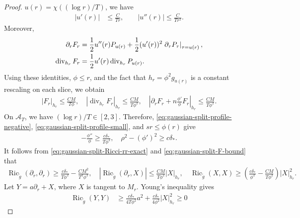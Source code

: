 \documentclass[11pt,reqno]{amsart}
\numberwithin{equation}{section}
\theoremstyle{definition}
\theoremstyle{remark}
\def\cA {\mathcal{A}}
\renewcommand{\div}{\operatorname{div}}
\newcommand{\ta}{\tau}
\newcommand{\0}{\emptyset}
\newcommand{\Ric}{\operatorname{Ric}}
\begin{document}
\begin{proof}
$u(r)=\chi((\log r)/T)$, we have
\begin{align}
        |u'(r)|
        &\leq
        \frac{C}{Tr},
        \qquad
        |u''(r)|
        \leq
        \frac{C}{Tr^2}.
\end{align}
Moreover,
\begin{align}
        \partial_rF_r
        &=
        \frac12u''(r)P_{u(r)}
        +
        \frac12(u'(r))^2
        \left.
        \partial_\ta P_\ta
        \right|_{\ta=u(r)},
        \notag\\
        \div_{h_r}F_r
        &=
        \frac12u'(r)
        \div_{h_r}P_{u(r)}.
\end{align}
Using these identities, $\phi\leq r$, and the fact that
$h_r=\phi^2g_{u(r)}$ is a constant rescaling on each slice, we obtain
\begin{align}\label{eq:gaussian-split-F-bound}
        |F_r|_{h_r}
        \leq
        \frac{CM}{T\phi},\quad 
        |\div_{h_r}F_r|_{h_r}
        \leq
        \frac{CM}{T\phi^2},\quad 
        \left|
        \partial_rF_r + n\frac{\phi'}{\phi}F_r
        \right|_{h_r}
        \leq
        \frac{CM}{T\phi^2}.
\end{align}
On $\cA_T$, we have $(\log r)/T\in[2,3]$. Therefore,
\eqref{eq:gaussian-split-profile-negative},
\eqref{eq:gaussian-split-profile-small}, and
$sr\leq\phi(r)$ give
\begin{align}
        -\frac{\phi''}{\phi}
        \geq
        \frac{c\delta_*}{T\phi^2},
        \quad
        \rho^2-(\phi')^2
        \geq
        c\delta_*.
\end{align}
It follows from \eqref{eq:gaussian-split-Ricci-rr-exact} and
\eqref{eq:gaussian-split-F-bound} that
\begin{align}
        \Ric_{\widetilde g}(\partial_r,\partial_r)
        \geq
        \frac{c\delta_*}{T\phi^2}
        -
        \frac{CM^2}{T^2\phi^2},\quad 
        \left|
        \Ric_{\widetilde g}(\partial_r,X)
        \right|
        \leq
        \frac{CM}{T\phi^2}|X|_{h_r},\quad
        \Ric_{\widetilde g}(X,X)
        \geq
        \left(
        \frac{c\delta_*}{\phi^2}
        -
        \frac{CM}{T\phi^2}
        \right)|X|_{h_r}^2.
\end{align}
Let $Y=a\partial_r+X$, where $X$ is tangent to $M_r$. Young's inequality
gives
\begin{align}
        \Ric_{\widetilde g}(Y,Y)
        &\geq
        \frac{c\delta_*}{4T\phi^2}a^2
        +
        \frac{c\delta_*}{4\phi^2}|X|_{h_r}^2
        \geq
        0
\end{align}

\end{proof}
\end{document}
